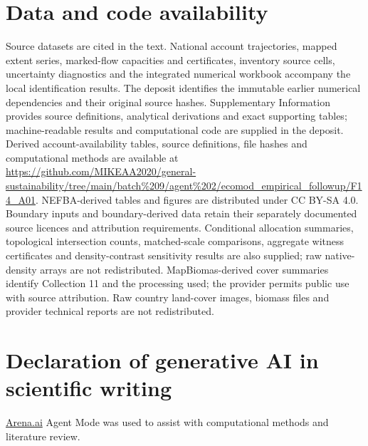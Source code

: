 \documentclass[11pt,a4paper]{article}
\begin{document}
\section*{Data and code availability}
Source datasets are cited in the text. National account trajectories, mapped extent series, marked-flow capacities and certificates, inventory source cells, uncertainty diagnostics and the integrated numerical workbook accompany the local identification results. The deposit identifies the immutable earlier numerical dependencies and their original source hashes. Supplementary Information provides source definitions, analytical derivations and exact supporting tables; machine-readable results and computational code are supplied in the deposit. Derived account-availability tables, source definitions, file hashes and computational methods are available at \url{https://github.com/MIKEAA2020/general-sustainability/tree/main/batch%209/agent%202/ecomod_empirical_followup/F14_A01}. NEFBA-derived tables and figures are distributed under CC BY-SA 4.0. Boundary inputs and boundary-derived data retain their separately documented source licences and attribution requirements. Conditional allocation summaries, topological intersection counts, matched-scale comparisons, aggregate witness certificates and density-contrast sensitivity results are also supplied; raw native-density arrays are not redistributed. MapBiomas-derived cover summaries identify Collection 11 and the processing used; the provider permits public use with source attribution. Raw country land-cover images, biomass files and provider technical reports are not redistributed.

\section*{Declaration of generative AI in scientific writing}
\href{http://Arena.ai}{Arena.ai} Agent Mode was used to assist with computational methods and literature review.
\end{document}
